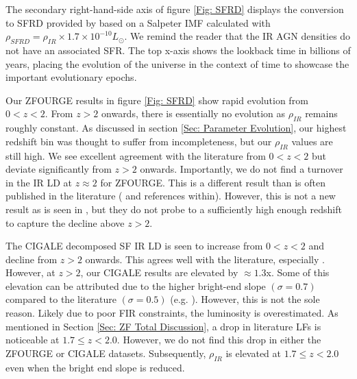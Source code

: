 The secondary right-hand-side axis of figure \ref{Fig: SFRD} displays the conversion to SFRD provided by \cite{kennicutt_global_1998} based on a Salpeter IMF calculated with $\rho_{SFRD} = \rho_{IR} \times 1.7\times10^{-10} L_{\odot}$. We remind the reader that the IR AGN densities do not have an associated SFR. The top x-axis shows the lookback time in billions of years, placing the evolution of the universe in the context of time to showcase the important evolutionary epochs.

Our ZFOURGE results in figure \ref{Fig: SFRD} show rapid evolution from $0<z<2$. From $z>2$ onwards, there is essentially no evolution as $\rho_{IR}$ remains roughly constant. As discussed in section \ref{Sec: Parameter Evolution}, our highest redshift bin was thought to suffer from incompleteness, but our $\rho_{IR}$ values are still high. We see excellent agreement with the literature from $0<z<2$ but deviate significantly from $z>2$ onwards. Importantly, we do not find a turnover in the IR LD at $z\approx2$ for ZFOURGE. This is a different result than is often published in the literature (\citealp{gruppioni_herschel_2013, magnelli_deepest_2013, madau_cosmic_2014, lutz_far-infrared_2014} and references within). However, this is not a new result as is seen in \cite{rodighiero_mid-_2010}, but they do not probe to a sufficiently high enough redshift to capture the decline above $z>2$.

The CIGALE decomposed SF IR LD is seen to increase from $0<z<2$ and decline from $z>2$ onwards. This agrees well with the literature, especially \cite{madau_cosmic_2014}. However, at $z>2$, our CIGALE results are elevated by $\approx 1.3$x. Some of this elevation can be attributed due to the higher bright-end slope $(\sigma = 0.7)$ compared to the literature $(\sigma = 0.5)$ (e.g. \citealp{gruppioni_herschel_2013}). However, this is not the sole reason. Likely due to poor FIR constraints, the luminosity is overestimated. As mentioned in Section \ref{Sec: ZF Total Discussion}, a drop in literature LFs is noticeable at $1.7\leq z< 2.0$. However, we do not find this drop in either the ZFOURGE or CIGALE datasets. Subsequently, $\rho_{IR}$ is elevated at $1.7\leq z< 2.0$ even when the bright end slope is reduced.  

